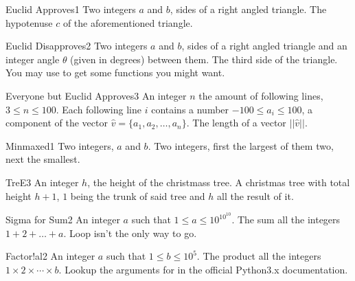 \begin{task}{Euclid Approves}{1}
\In
Two integers $a$ and $b$, sides of a right angled triangle.
\Out
The hypotenuse $c$ of the aforementioned triangle.

\begin{ExampleIO}
\end{ExampleIO}
\end{task}

\begin{task}{Euclid Disapproves}{2}
\In
Two integers $a$ and $b$, sides of a right angled triangle and an integer angle
$\theta$ (given in degrees) between them.
\Out
The third side of the triangle.
\Hint
You may use  to get some functions you might want.
\end{task}

\begin{task}{Everyone but Euclid Approves}{3}
\In
An integer $n$ the amount of following lines, $3 \leq n \leq 100$. 
Each following line $i$ contains a number $-100 \leq a_i \leq 100$, a 
component of the vector $\hat{v} = \{a_1, a_2, \dots, a_n\}$.
\Out
The length of a vector $||\hat{v}||$.
\end{task}

\begin{task}{Minmaxed}{1}
\In
Two integers, $a$ and $b$.
\Out
Two integers, first the largest of them two, next the smallest.
\end{task}

\begin{task}{TreE}{3}
\In
An integer $h$, the height of the christmass tree.
\Out
A christmas tree with total height $h + 1$, $1$ being the trunk of said
tree and $h$ all the result of it.

\begin{ExampleIO}
\end{ExampleIO}
\end{task}

\begin{task}{Sigma for Sum}{2}
\In
An integer $a$ such that $1 \leq a \leq 10^{10^{10}}$.
\Out
The sum all the integers $1 + 2 + \dots + a$.
\Hint
Loop isn't the only way to go.
\end{task}

\begin{task}{Factor!al}{2}
\In
An integer $a$ such that $1 \leq b \leq 10^{5}$.
\Out
The product all the integers $1 \times 2 \times \cdots \times b$.
\Hint
Lookup the arguments for  in the official Python3.x documentation.
\end{task}

